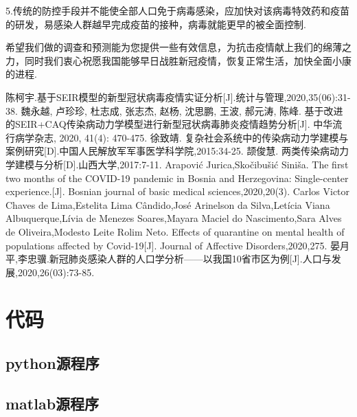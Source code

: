 \documentclass{whutmod}
\begin{document}
	5.传统的防控手段并不能使全部人口免于病毒感染，应加快对该病毒特效药和疫苗的研发，易感染人群越早完成疫苗的接种，病毒就能更早的被全面控制.
	
	
	希望我们做的调查和预测能为您提供一些有效信息，为抗击疫情献上我们的绵薄之力，同时我们衷心祝愿我国能够早日战胜新冠疫情，恢复正常生活，加快全面小康的进程.
	
	
		

\appendix %
\begin{thebibliography}{9}%
	陈柯宇.基于SEIR模型的新型冠状病毒疫情实证分析[J].统计与管理,2020,35(06):31-38.
	魏永越, 卢珍珍, 杜志成, 张志杰, 赵杨, 沈思鹏, 王波, 郝元涛, 陈峰. 基于改进的SEIR+CAQ传染病动力学模型进行新型冠状病毒肺炎疫情趋势分析[J]. 中华流行病学杂志, 2020, 41(4): 470-475.
	徐致靖. 复杂社会系统中的传染病动力学建模与案例研究[D].中国人民解放军军事医学科学院,2015:34-25.
	颉俊慧. 两类传染病动力学建模与分析[D].山西大学,2017:7-11.
	Arapović Jurica,Skočibušić Siniša. The first two months of the COVID-19 pandemic in Bosnia and Herzegovina: Single-center experience.[J]. Bosnian journal of basic medical sciences,2020,20(3).
	Carlos Victor Chaves de Lima,Estelita Lima Cândido,José Arinelson da Silva,Letícia Viana Albuquerque,Lívia de Menezes Soares,Mayara Maciel do Nascimento,Sara Alves de Oliveira,Modesto Leite Rolim Neto. Effects of quarantine on mental health of populations affected by Covid-19[J]. Journal of Affective Disorders,2020,275.
	晏月平,李忠骥.新冠肺炎感染人群的人口学分析——以我国10省市区为例[J].人口与发展,2020,26(03):73-85.

\end{thebibliography}


\section{代码}
\subsection{python源程序}






\subsection{matlab源程序}






\end{document}
